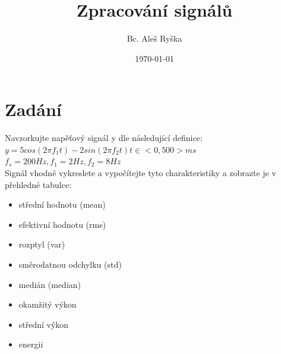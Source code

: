 \documentclass{article}
\title{Zpracování signálů} %
\author{Bc. Aleš Ryška} %
\date{\today} %
\begin{document}
\maketitle %



\section{Zadání}
Navzorkujte napěťový signál y dle následující definice:\\
$y = 5cos(2 \pi f_1 t)-2sin(2\pi f_2 t) t\in <0,500>ms $\\
$f_s = 200 Hz, f_1 = 2Hz, f_2 = 8Hz$\\

Signál vhodně vykreslete a vypočítejte tyto charakteristiky a zobrazte je v přehledné tabulce:
\begin{itemize}
	\item střední hodnotu (mean)
	\item efektivní hodnotu (rms)
	\item rozptyl (var)
	\item směrodatnou odchylku (std)
	\item medián (median)
	\item okamžitý výkon
	\item střední výkon
	\item energii
\end{itemize}
\end{document}

